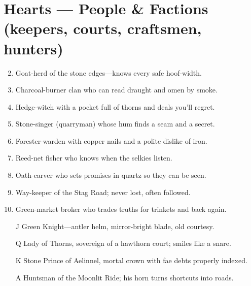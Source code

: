 \section*{Hearts --- People \& Factions (keepers, courts, craftsmen, hunters)}
\label{sec:aelinnel-people}
\begin{enumerate}
\setcounter{enumi}{1}
\item Goat-herd of the stone edges---knows every safe hoof-width.
\item Charcoal-burner clan who can read draught and omen by smoke.
\item Hedge-witch with a pocket full of thorns and deals you'll regret.
\item Stone-singer (quarryman) whose hum finds a seam and a secret.
\item Forester-warden with copper nails and a polite dislike of iron.
\item Reed-net fisher who knows when the selkies listen.
\item Oath-carver who sets promises in quartz so they can be seen.
\item Way-keeper of the Stag Road; never lost, often followed.
\item Green-market broker who trades truths for trinkets and back again.
\item[J] Green Knight---antler helm, mirror-bright blade, old courtesy.
\item[Q] Lady of Thorns, sovereign of a hawthorn court; smiles like a snare.
\item[K] Stone Prince of Aelinnel, mortal crown with fae debts properly indexed.
\item[A] Huntsman of the Moonlit Ride; his horn turns shortcuts into roads.
\end{enumerate}

